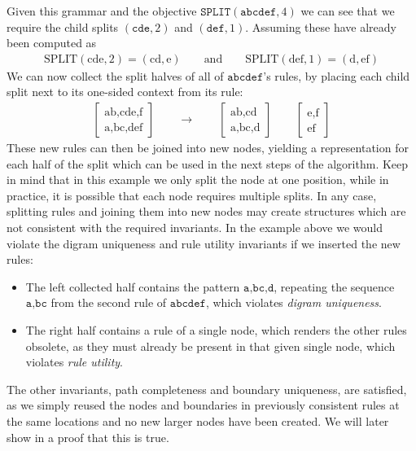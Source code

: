 Given this grammar and the objective $\texttt{SPLIT}(\texttt{abcdef}, {4})$ we can see that we require the child splits $(\texttt{cde}, 2)$ and $(\texttt{def}, 1)$. Assuming these have already been computed as
{
    \ttfamily
    \noindent
    \begin{align*}
        \text{SPLIT}(\text{cde}, 2) = (\text{cd}, \text{e})
        \qquad
        \textrm{and}
        \qquad
        \text{SPLIT}(\text{def}, 1) = (\text{d}, \text{ef})
    \end{align*}
}
We can now collect the split halves of all of $\texttt{abcdef}$'s rules, by placing each child split next to its one-sided context from its rule:
{
    \ttfamily
    \noindent
    \begin{align*}
        \begin{bmatrix}
            \text{ab,cde,f}\\
            \text{a,bc,def}
        \end{bmatrix}
        \qquad
        \longrightarrow
        \qquad
        \begin{bmatrix}
            \text{ab,cd}\\
            \text{a,bc,d}
        \end{bmatrix}
        \qquad
        \begin{bmatrix}
            \text{e,f}\\
            \text{ef}
        \end{bmatrix}
    \end{align*}
}
These new rules can then be joined into new nodes, yielding a representation for each half of the split which can be used in the next steps of the algorithm. Keep in mind that in this example we only split the node at one position, while in practice, it is possible that each node requires multiple splits.
\bigbreak%
In any case, splitting rules and joining them into new nodes may create structures which are not consistent with the required invariants. In the example above we would violate the digram uniqueness and rule utility invariants if we inserted the new rules:

\begin{itemize}
    \item The left collected half contains the pattern $\texttt{a,bc,d}$, repeating the sequence $\texttt{a,bc}$ from the second rule of $\texttt{abcdef}$, which violates \textit{digram uniqueness}.
    \item The right half contains a rule of a single node, which renders the other rules obsolete, as they must already be present in that given single node, which violates \textit{rule utility}.
\end{itemize}
The other invariants, path completeness and boundary uniqueness, are satisfied, as we simply reused the nodes and boundaries in previously consistent rules at the same locations and no new larger nodes have been created. We will later show in a proof that this is true.


